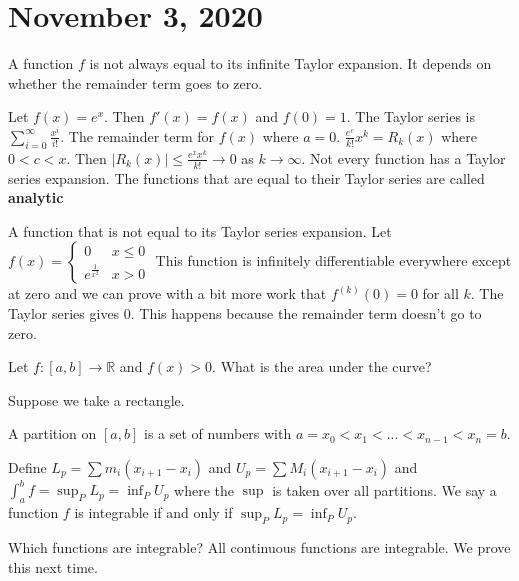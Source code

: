 \documentclass{article}
\newcommand{\vocab}[1]{\textbf{\color{blue!90}\boldmath #1}}
\newcommand{\R}{\mathbb{R}}
\newcommand{\ra}[1][]{\xrightarrow{#1}}
\begin{document}
\section{November 3, 2020}
A function $f$ is not always equal to its infinite Taylor expansion. It depends on whether the remainder term goes to zero.
\begin{example}
Let $f(x)=e^x$. Then $f'(x)=f(x)$ and $f(0)=1$. The Taylor series is $\sum_{i=0}^\infty\frac{x^i}{i!}$. The remainder term for $f(x)$ where $a=0$. $\frac{e^c}{k!}x^k=R_k(x)$ where $0<c<x$. Then $|R_k(x)|\leq \frac{e^xx^k}{k!}\ra 0$ as $k\ra \infty$. Not every function has a Taylor series expansion. The functions that are equal to their Taylor series are called \vocab{analytic}
\end{example}
\begin{example}
A function that is not equal to its Taylor series expansion. Let $f(x)=
\begin{cases}
0& x\leq 0\\
e^{\frac{1}{x^2}}&x>0
\end{cases}$
This function is infinitely differentiable everywhere except at zero and we can prove with a bit more work that $f^{(k)}(0)=0$ for all $k$. The Taylor series gives 0. This happens because the remainder term doesn't go to zero.
\end{example}
\begin{definition}
Let $f:[a,b]\ra\R$ and $f(x)>0$. What is the area under the curve?
\end{definition}
Suppose we take a rectangle.
\begin{definition}[A Partition]
A partition on $[a,b]$ is a set of numbers with $a=x_0<x_1<...<x_{n-1}<x_n=b$.
\end{definition}
Define $L_p=\sum m_i(x_{i+1}-x_i)$ and $U_p=\sum M_i(x_{i+1}-x_i)$ and $\int_a^b f=\sup_P L_p=\inf_P U_p$ where the $\sup$ is taken over all partitions. We say a function $f$ is integrable if and only if $\sup_P L_p=\inf_P U_p$.

Which functions are integrable? All continuous functions are integrable. We prove this next time.
\end{document}
